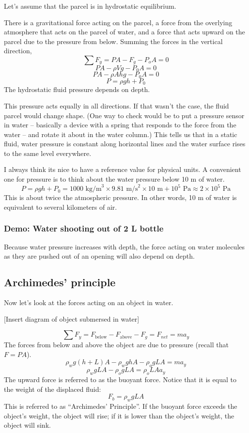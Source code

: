 Let's assume that the parcel is in hydrostatic equilibrium.

There is a gravitational force acting on the parcel, a force from the overlying atmosphere that acts on the parcel of water, and a force that acts upward on the parcel due to the pressure from below. Summing the forces in the vertical direction,
$$\sum F_y = PA - F_g - P_oA = 0$$
$$PA - \rho Vg - P_0A = 0$$
$$PA - \rho Ahg - P_0A = 0$$
$$\boxed{P = \rho gh + P_0}$$
The hydrostatic fluid pressure depends on depth.

This pressure acts equally in all directions. If that wasn't the case, the fluid parcel would change shape. (One way to check would be to put a pressure sensor in water -- basically a device with a spring that responds to the force from the water -- and rotate it about in the water column.) This tells us that in a static fluid, water pressure is constant along horizontal lines and the water surface rises to the same level everywhere.

I always think its nice to have a reference value for physical units. A convenient one for pressure is to think about the water pressure below 10 m of water.
$$P=\rho gh+P_0=1000\mbox{ kg/m}^3\times 9.81\mbox{ m/s}^2\times 10\mbox{ m} + 10^5\mbox{ Pa} \approx 2\times 10^5\mbox{ Pa}$$
This is about twice the atmospheric pressure. In other words, 10 m of water is equivalent to several kilometers of air.

\subsubsection{Demo: Water shooting out of 2 L bottle}
Because water pressure increases with depth, the force acting on water molecules as they are pushed out of an opening will also depend on depth.

\subsection{Archimedes' principle}
Now let's look at the forces acting on an object in water. 

[Insert diagram of object submersed in water]
\vspace{5cm}

$$\sum F_y=F_{\mbox{below}}-F_{\mbox{above}}-F_g=F_{net}=ma_y$$
The forces from below and above the object are due to pressure (recall that $F=PA$).
$$\rho_w g(h+L)A-\rho_w ghA-\rho_o gLA=ma_y$$
$$\rho_w gLA-\rho_o gLA=\rho_oLAa_y$$
The upward force is referred to as the buoyant force. Notice that it is equal to the weight of the displaced fluid:
$$F_b=\rho_wgLA$$
This is referred to as ``Archimedes' Principle''. If the buoyant force exceeds the object's weight, the object will rise; if it is lower than the object's weight, the object will sink. 

